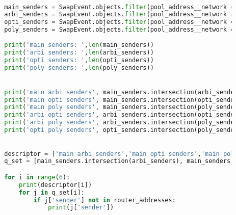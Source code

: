 \begin{lstlisting}[language=python]
        

        main_senders = SwapEvent.objects.filter(pool_address__network = MAIN).values("sender").distinct()
        arbi_senders = SwapEvent.objects.filter(pool_address__network = ARBI).values("sender").distinct()
        opti_senders = SwapEvent.objects.filter(pool_address__network = OPTI).values("sender").distinct()
        poly_senders = SwapEvent.objects.filter(pool_address__network = POLY).values("sender").distinct()
        
        print('main senders: ',len(main_senders))
        print('arbi senders: ',len(arbi_senders))
        print('opti senders: ',len(opti_senders))
        print('poly senders: ',len(poly_senders))


        print('main arbi senders', main_senders.intersection(arbi_senders))
        print('main opti senders', main_senders.intersection(opti_senders))
        print('main poly senders', main_senders.intersection(poly_senders))
        print('arbi opti senders', arbi_senders.intersection(opti_senders))
        print('arbi poly senders', arbi_senders.intersection(poly_senders))
        print('opti poly senders', opti_senders.intersection(poly_senders))

        
        descriptor = ['main arbi senders','main opti senders','main poly senders','arbi opti senders','arbi poly senders','opti poly senders']
        q_set = [main_senders.intersection(arbi_senders), main_senders.intersection(opti_senders), main_senders.intersection(poly_senders), arbi_senders.intersection(opti_senders), arbi_senders.intersection(poly_senders),  opti_senders.intersection(poly_senders)]

        for i in range(6):
            print(descriptor[i])
            for j in q_set[i]:
                if j['sender'] not in router_addresses:
                    print(j['sender'])
\end{lstlisting}